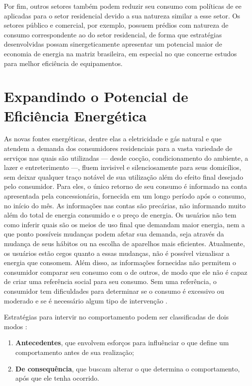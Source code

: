 Por fim, outros setores também podem reduzir seu consumo com políticas de
\gls{ee} aplicadas para o setor residencial devido a sua natureza similar a esse
setor. Os setores público e comercial, por exemplo, possuem prédios com natureza
de consumo correspondente ao do setor residencial, de forma que estratégias 
desenvolvidas possam sinergeticamente apresentar um potencial maior de 
economia de energia na matriz brasileira, em especial no que concerne estudos
para melhor eficiência de equipamentos.

\section{Expandindo o Potencial de Eficiência Energética}
\label{sec:ee_res_exp}

As novas fontes energéticas, dentre elas a eletricidade e gás natural e 
que atendem a demanda dos consumidores residenciais para a vasta 
variedade de serviços nas quais são utilizadas 
--- desde cocção, condicionamento do ambiente, a lazer e 
entreterimento ---, fluem invisivel e silenciosamente para seus domicílios, sem
deixar qualquer traço notável de sua utilização além do efeito final desejado pelo
consumidor. Para eles, o único retorno de seu consumo é informado na conta
apresentada pela concessionária, fornecida em um longo período após o consumo,
no início do mês. As informações nas contas são precárias, não informando 
muito além do total de energia consumido e o preço de energia. 
Os usuários não tem como inferir quais são os meios de uso final que demandam 
maior energia, nem a que ponto possíveis mudanças podem afetar sua demanda, 
seja através da mudança de seus hábitos ou na escolha 
de aparelhos mais eficientes. Atualmente, os usuários estão cegos quanto a essas
mudanças, não é possível vizualisar a energia que consomem. Além disso, as
informações fornecidas não permitem o consumidor comparar seu consumo com o de
outros, de modo que ele não é capaz de criar uma referência social para seu consumo.
Sem uma referência, o consumidor tem dificuldades para determinar se o consumo é
excessivo ou moderado e se é necessário algum tipo de intervenção 
\cite{aceee_2010_estudos_feedback}.

Estratégias para intervir no comportamento podem ser classificadas de dois modos
\cite{aceee_2010_estudos_feedback,2009_epri}:
\begin{enumerate}
\item \textbf{Antecedentes}, que envolvem esforços para influênciar o que define 
um comportamento antes de sua realização; 
\item \textbf{De consequência}, que buscam alterar o que determina o 
comportamento, após que ele tenha ocorrido. 
\end{enumerate}

